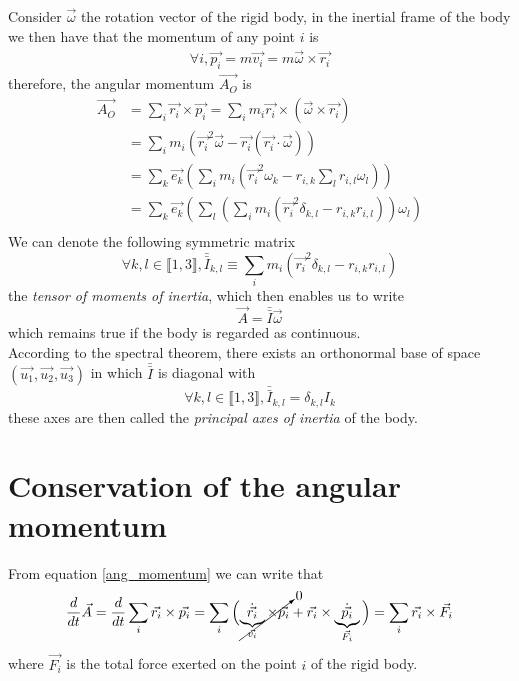 \documentclass[class=report, float=false, crop=false]{standalone}
\begin{document}
Consider $\vec{\omega}$ the rotation vector of the rigid body, in the inertial frame of the body we then have that the momentum of any point $i$ is
\begin{align*}
\forall i, \vec{p_i} = m\vec{v_i} = m\vec{\omega}\times\vec{r_i}
\end{align*}
therefore, the angular momentum $\vec{A_O}$ is
\begin{align*}
\vec{A_O} &= \sum_i \vec{r_i}\times\vec{p_i} = \sum_i m_i \vec{r_i}\times\left(\vec{\omega}\times\vec{r_i}\right)\\
&= \sum_i m_i \left(\vec{r_i}^2 \vec{\omega} - \vec{r_i} \left(\vec{r_i} \cdot \vec{\omega}\right)\right)\\
&= \sum_k \vec{e_k} \left( \sum_i m_i \left(\vec{r_i}^2\omega_k - r_{i,k}\sum_l r_{i,l}\omega_l\right) \right)\\
&= \sum_k \vec{e_k} \left( \sum_l \left(\sum_i m_i \left(\vec{r_i}^2 \delta_{k,l} - r_{i,k}r_{i,l}\right)\right)\omega_l\right)\\
\end{align*}
We can denote the following symmetric matrix
\begin{equation}
\boxed{\forall k,l \in \llbracket1,3\rrbracket, \bar{\bar{I}}_{k,l} \equiv \sum_i m_i \left(\vec{r_i}^2 \delta_{k,l} - r_{i,k}r_{i,l}\right)}
\label{tensor_inertia}
\end{equation}
the \textit{tensor of moments of inertia}, which then enables us to write
\begin{equation}
\boxed{\vec{A} = \bar{\bar{I}} \vec{\omega}}
\label{ang_momentum_inertia}
\end{equation}
which remains true if the body is regarded as continuous.\\

According to the spectral theorem, there exists an orthonormal base of space $(\vec{u_1},\vec{u_2},\vec{u_3})$ in which $\bar{\bar{I}}$ is diagonal with
\begin{equation}
\forall k,l \in \llbracket1,3\rrbracket, \bar{\bar{I}}_{k,l} = \delta_{k,l}I_k
\label{tensor_inertia_diag}
\end{equation}
these axes are then called the \textit{principal axes of inertia} of the body.

\section{Conservation of the angular momentum}

From equation \ref{ang_momentum} we can write that
\begin{align*}
\frac{d}{dt}\vec{A} = \frac{d}{dt} \sum_i \vec{r_i}\times\vec{p_i} = \sum_i \Big(\cancelto{0}{\underbrace{\dot{\vec{r_i}}}_{\vec{v_i}}\times\vec{p_i}} + \vec{r_i}\times\underbrace{\dot{\vec{p_i}}}_{\vec{F_i}}\Big) = \sum_i \vec{r_i}\times\vec{F_i}
\end{align*}
where $\vec{F_i}$ is the total force exerted on the point $i$ of the rigid body.\\
\end{document}
